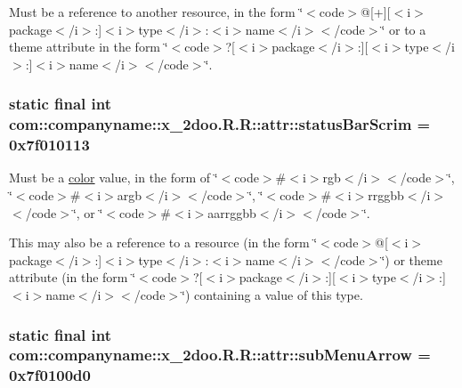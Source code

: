 Must be a reference to another resource, in the form \char`\"{}$<$code$>$@\mbox{[}+\mbox{]}\mbox{[}$<$i$>$package$<$/i$>$:\mbox{]}$<$i$>$type$<$/i$>$:$<$i$>$name$<$/i$>$$<$/code$>$\char`\"{} or to a theme attribute in the form \char`\"{}$<$code$>$?\mbox{[}$<$i$>$package$<$/i$>$:\mbox{]}\mbox{[}$<$i$>$type$<$/i$>$:\mbox{]}$<$i$>$name$<$/i$>$$<$/code$>$\char`\"{}. \hypertarget{classcom_1_1companyname_1_1x__2doo_1_1_r_1_1attr_6175b14225e12b675c99924b7c9b602b}{
\subsubsection[{statusBarScrim}]{\setlength{\rightskip}{0pt plus 5cm}static final int com::companyname::x\_\-2doo.R.R::attr::statusBarScrim = 0x7f010113}}
\label{classcom_1_1companyname_1_1x__2doo_1_1_r_1_1attr_6175b14225e12b675c99924b7c9b602b}


Must be a \hyperlink{classcom_1_1companyname_1_1x__2doo_1_1_r_1_1color}{color} value, in the form of \char`\"{}$<$code$>$\#$<$i$>$rgb$<$/i$>$$<$/code$>$\char`\"{}, \char`\"{}$<$code$>$\#$<$i$>$argb$<$/i$>$$<$/code$>$\char`\"{}, \char`\"{}$<$code$>$\#$<$i$>$rrggbb$<$/i$>$$<$/code$>$\char`\"{}, or \char`\"{}$<$code$>$\#$<$i$>$aarrggbb$<$/i$>$$<$/code$>$\char`\"{}. 

This may also be a reference to a resource (in the form \char`\"{}$<$code$>$@\mbox{[}$<$i$>$package$<$/i$>$:\mbox{]}$<$i$>$type$<$/i$>$:$<$i$>$name$<$/i$>$$<$/code$>$\char`\"{}) or theme attribute (in the form \char`\"{}$<$code$>$?\mbox{[}$<$i$>$package$<$/i$>$:\mbox{]}\mbox{[}$<$i$>$type$<$/i$>$:\mbox{]}$<$i$>$name$<$/i$>$$<$/code$>$\char`\"{}) containing a value of this type. \hypertarget{classcom_1_1companyname_1_1x__2doo_1_1_r_1_1attr_531c064d5698e0ea147b9b5e4c783d0c}{
\subsubsection[{subMenuArrow}]{\setlength{\rightskip}{0pt plus 5cm}static final int com::companyname::x\_\-2doo.R.R::attr::subMenuArrow = 0x7f0100d0}}
\label{classcom_1_1companyname_1_1x__2doo_1_1_r_1_1attr_531c064d5698e0ea147b9b5e4c783d0c}


